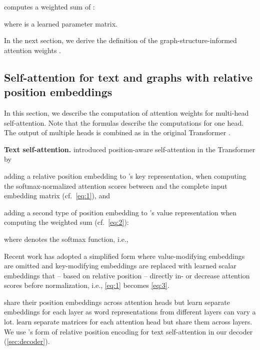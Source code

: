 \documentclass[11pt]{article}
\newcommand{\para}[1]{\noindent\textbf{#1.}}
\begin{document}
 computes a weighted sum of :

where  is a learned parameter matrix.

In the next section, we derive the definition of the graph-structure-informed attention weights .

\subsection{Self-attention for text and graphs with relative position embeddings}
\label{sec:self-att}

In this section, we describe the computation of attention weights for multi-head self-attention.
Note that the formulas describe the computations for one head.
The output of multiple heads is combined as in the original Transformer \citep{vaswani17}.

\para{Text self-attention}
\citet{shaw-etal-2018-self} introduced position-aware self-attention in the Transformer
by
\begin{enumerate*}[label={(\roman*)}]
  \item adding a relative position embedding  to 's key representation, when computing the softmax-normalized attention scores  between  and the complete input embedding matrix  (cf.\ \cref{eq:1}), and
  \item adding a second type of position embedding  to 's value representation when computing the weighted sum (cf.\ \cref{eq:2}):
\end{enumerate*}

where  denotes the softmax function, i.e.,


Recent work \citep{raffel19} has adopted a simplified form
where value-modifying embeddings  are omitted
and key-modifying embeddings  are replaced
with learned scalar embeddings  that -- based on relative position -- directly in- or decrease attention scores before normalization,
i.e., \cref{eq:1} becomes \cref{eq:3}.


\citet{shaw-etal-2018-self} share their position embeddings across attention heads
but learn separate embeddings for each layer
as word representations from different layers can vary a lot.
\citet{raffel19} learn separate  matrices for each attention head but share them across layers.
We use \citet{raffel19}'s form of relative position encoding for text self-attention in our decoder (\cref{sec:decoder}).
\end{document}
